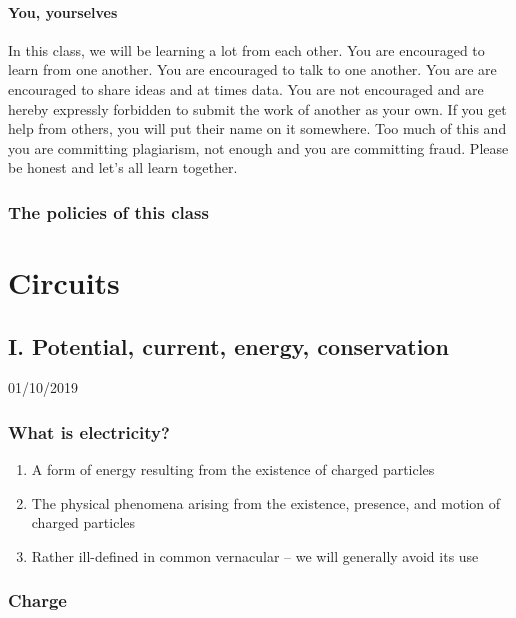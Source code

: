\documentclass[11pt]{book}
\begin{document}
\subsection{You, yourselves}
In this class, we will be learning a lot from each other. You are encouraged to learn from one another. You are encouraged to talk to one another. You are are encouraged to share ideas and at times data. You are not encouraged and are hereby expressly forbidden to submit the work of another as your own. If you get help from others, you will put their name on it somewhere. Too much of this and you are committing plagiarism, not enough and you are committing fraud. Please be honest and let's all learn together.



\newpage
\section{The policies of this class}


\mainmatter
\setcounter{page}{1}



\part{Circuits}



\chapter{I. Potential, current, energy, conservation}
01/10/2019
\minitoc



\section{What is electricity?}

\begin{enumerate}
	\item A form of energy resulting from the existence of charged particles 
	\item The physical phenomena arising from the existence, presence, and motion of charged particles
	\item Rather ill-defined in common vernacular – we will generally avoid its use
\end{enumerate}



\section{Charge}
 
\end{document}
